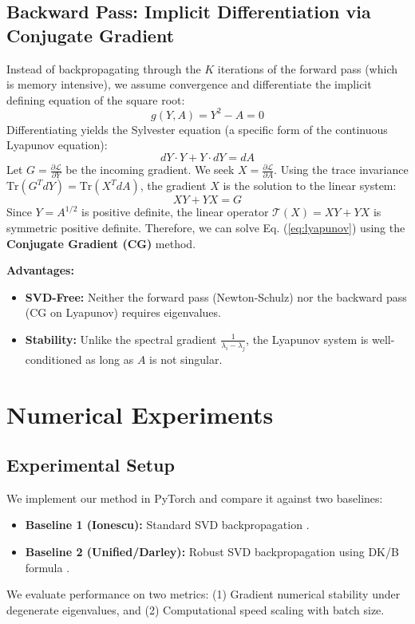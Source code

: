 \documentclass{article}
\newcommand{\Tr}{\text{Tr}} %
\begin{document}
\subsection{Backward Pass: Implicit Differentiation via Conjugate Gradient}
Instead of backpropagating through the $K$ iterations of the forward pass (which is memory intensive), we assume convergence and differentiate the implicit defining equation of the square root:
\begin{equation}
  g(Y, A) = Y^2 - A = 0
\end{equation}
Differentiating yields the Sylvester equation (a specific form of the continuous Lyapunov equation):
\begin{equation}
  dY \cdot Y + Y \cdot dY = dA
\end{equation}
Let $G = \frac{\partial \mathcal{L}}{\partial Y}$ be the incoming gradient. We seek $X = \frac{\partial \mathcal{L}}{\partial A}$. Using the trace invariance $\Tr(G^T dY) = \Tr(X^T dA)$, the gradient $X$ is the solution to the linear system:
\begin{equation}
  \label{eq:lyapunov}
  X Y + Y X = G
\end{equation}
Since $Y = A^{1/2}$ is positive definite, the linear operator $\mathcal{T}(X) = XY + YX$ is symmetric positive definite. Therefore, we can solve Eq. (\ref{eq:lyapunov}) using the \textbf{Conjugate Gradient (CG)} method.

\textbf{Advantages:}
\begin{itemize}
  \item \textbf{SVD-Free:} Neither the forward pass (Newton-Schulz) nor the backward pass (CG on Lyapunov) requires eigenvalues.
  \item \textbf{Stability:} Unlike the spectral gradient $\frac{1}{\lambda_i - \lambda_j}$, the Lyapunov system is well-conditioned as long as $A$ is not singular.
\end{itemize}

\section{Numerical Experiments}
\label{sec:experiments}

\subsection{Experimental Setup}
We implement our method in PyTorch and compare it against two baselines:
\begin{itemize}
  \item \textbf{Baseline 1 (Ionescu):} Standard SVD backpropagation \cite{ionescu2015matrix}.
  \item \textbf{Baseline 2 (Unified/Darley):} Robust SVD backpropagation using DK/B formula \cite{darley2024unified}.
\end{itemize}
We evaluate performance on two metrics: (1) Gradient numerical stability under degenerate eigenvalues, and (2) Computational speed scaling with batch size.
\end{document}
